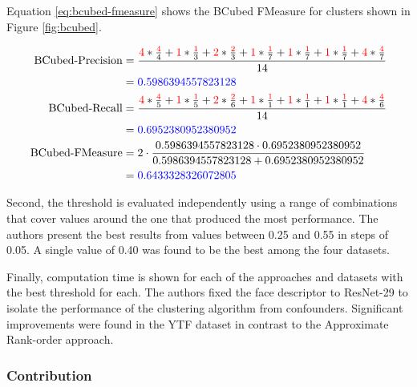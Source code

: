 \documentclass[17pt,]{extarticle}
\begin{document}
Equation \ref{eq:bcubed-fmeasure} shows the BCubed FMeasure for clusters shown in Figure \ref{fig:bcubed}.

\small

\begin{equation}
\begin{aligned}
\text{BCubed-Precision} &= \frac{\textcolor{red}{4}*\frac{\textcolor{red}{4}}{4}+\textcolor{red}{1}*\frac{\textcolor{red}{1}}{3}+\textcolor{red}{2}*\frac{\textcolor{red}{2}}{3}+\textcolor{red}{1}*\frac{\textcolor{red}{1}}{7}+\textcolor{red}{1}*\frac{\textcolor{red}{1}}{7}+\textcolor{red}{1}*\frac{\textcolor{red}{1}}{7}+\textcolor{red}{4}*\frac{\textcolor{red}{4}}{7}}{14} \\
& = \textcolor{blue}{0.5986394557823128}\\
\text{BCubed-Recall} &= \frac{\textcolor{red}{4}*\frac{\textcolor{red}{4}}{5}+\textcolor{red}{1}*\frac{\textcolor{red}{1}}{5}+\textcolor{red}{2}*\frac{\textcolor{red}{2}}{6}+\textcolor{red}{1}*\frac{\textcolor{red}{1}}{1}+\textcolor{red}{1}*\frac{\textcolor{red}{1}}{1}+\textcolor{red}{1}*\frac{\textcolor{red}{1}}{1}+\textcolor{red}{4}*\frac{\textcolor{red}{4}}{6}}{14} \\
& = \textcolor{blue}{0.6952380952380952}\\
\text{BCubed-FMeasure} &= 2\cdot\frac{0.5986394557823128\cdot0.6952380952380952}{0.5986394557823128+0.6952380952380952}\\
& = \textcolor{blue}{0.6433328326072805}
\end{aligned}
\label{eq:bcubed-fmeasure}\end{equation}
\normalsize

Second, the threshold is evaluated independently using a range of combinations that cover values around the one that produced the most performance. The authors present the best results from values between 0.25 and 0.55 in steps of 0.05. A single value of 0.40 was found to be the best among the four datasets.

Finally, computation time is shown for each of the approaches and datasets with the best threshold for each. The authors fixed the face descriptor to ResNet-29 to isolate the performance of the clustering algorithm from confounders. Significant improvements were found in the YTF dataset in contrast to the Approximate Rank-order approach.

\hypertarget{contribution}{%
\subsubsection{Contribution}\label{contribution}}
\end{document}
